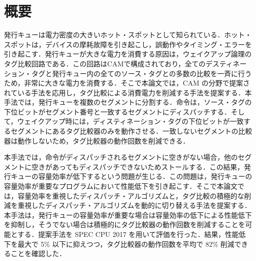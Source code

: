 
\chapter*{概要}
発行キューは電力密度の大きいホット・スポットとして知られている．ホット・スポットは，デバイスの摩耗故障を引き起こし，誤動作やタイミング・エラーを引き起こす．発行キューが大きな電力を消費する原因は，ウェイクアップ論理のタグ比較回路である．この回路はCAMで構成されており，全てのデスティネーション・タグと発行キュー内の全てのソース・タグとの多数の比較を一斉に行うため，非常に大きな電力を消費する．そこで本論文では，CAM の分野で提案されている手法を応用し，タグ比較による消費電力を削減する手法を提案する．本手法では，発行キューを複数のセグメントに分割する．命令は，ソース・タグの下位ビットがセグメント番号と一致するセグメントにディスパッチする．そして，ウェイクアップ時には，ディスティネーション・タグの下位ビットが一致するセグメントにあるタグ比較器のみを動作させる．一致しないセグメントの比較器は動作しないため，タグ比較器の動作回数を削減できる．

本手法では，命令がディスパッチされるセグメントに空きがない場合，他のセグメントに空きがあってもディスパッチできないためストールする．この結果，発行キューの容量効率が低下するという問題が生じる．この問題は，発行キューの容量効率が重要なプログラムにおいて性能低下を引き起こす．そこで本論文では，容量効率を重視したディスパッチ・アルゴリズムと，タグ比較の積極的な削減を重視したディスパッチ・アルゴリズムを動的に切り替える手法を提案する．本手法は，発行キューの容量効率が重要な場合は容量効率の低下による性能低下を抑制し，そうでない場合は積極的にタグ比較器の動作回数を削減することを可能とする．提案手法を SPEC CPU 2017 を用いて評価を行った．結果，性能低下を最大で 5\% 以下に抑えつつ，タグ比較器の動作回数を平均で 82\% 削減できることを確認した．
